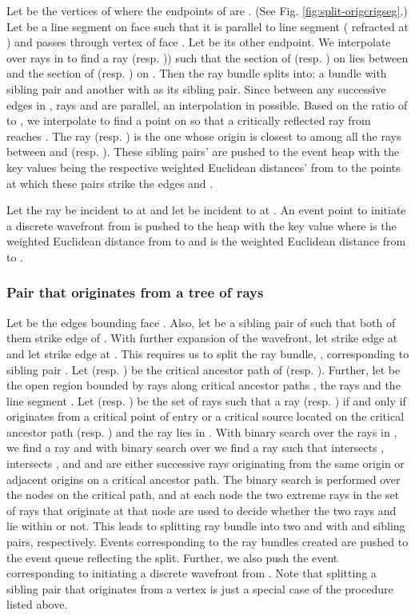 \documentclass[11pt]{article}
\begin{document}
Let  be the vertices of  where the endpoints of  are . 
(See Fig. \ref{fig:split-origcrigseg}.)
Let  be a line segment on face  such that it is parallel to line segment  ( refracted at ) and passes through vertex  of face . 
Let  be its other endpoint.
We interpolate over rays in  to find a ray  (resp. )) such that the section of  (resp. ) on  lies between  and the section of  (resp. ) on .
Then the ray bundle  splits into: a bundle with sibling pair  and another with  as its sibling pair.
Since between any successive edges in , rays  and  are parallel, an interpolation in possible.
Based on the ratio of  to , we interpolate to find a point  on  so that a critically reflected ray  from  reaches .
The ray  (resp. ) is the one whose origin is closest to  among all the rays between  and  (resp. ).
These sibling pairs' are pushed to the event heap with the key values being the respective weighted Euclidean distances' from  to the points at which these pairs strike the edges  and . 

Let the ray  be incident to  at  and let  be  incident to  at .
An event point to initiate a discrete wavefront from  is pushed  to the heap with the key value  where  is the weighted Euclidean distance from  to  and  is the weighted Euclidean distance from  to .

\subsubsection{Pair that originates from a tree of rays}
\label{subsubsect:splittreeofrays}

Let  be the edges bounding face .
Also, let  be a sibling pair of  such that both of them strike edge  of .
With further expansion of the wavefront, let  strike edge  at  and let  strike edge  at .
This requires us to split the ray bundle, , corresponding to sibling pair .
Let  (resp. ) be the critical ancestor path of  (resp. ).
Further, let  be the open region bounded by rays along critical ancestor paths , the rays  and the line segment .
Let  (resp. ) be the set of rays such that a ray  (resp. ) if and only if  originates from a critical point of entry or a critical source located on the critical ancestor path  (resp. ) and the ray  lies in .
With binary search over the rays in , we find a ray  and with binary search over  we find a ray  such that  intersects ,  intersects , and  and  are either successive rays originating from the same origin or adjacent origins on a critical ancestor path. The binary search
is performed over the nodes on the critical path, and at each node  the two extreme rays in the set of rays  that originate  at that node are used to decide whether the two rays  and  lie within  or not. 
This leads to splitting ray bundle   into two  and  
with  and  sibling pairs, respectively.
Events corresponding to the ray bundles created are pushed to the event queue reflecting the split.
Further, we also push the event corresponding to initiating a discrete wavefront from .
Note that splitting a sibling pair that originates from a vertex is just a special case of the procedure listed above. 
\end{document}
